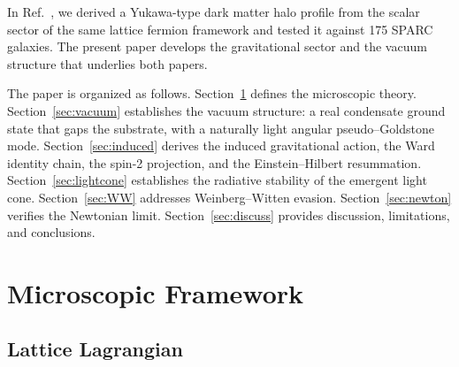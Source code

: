 \documentclass[11pt,a4paper]{article}
\begin{document}
In Ref.~\cite{Cheng:2025sparc}, we derived a Yukawa-type dark
matter halo profile from the scalar sector of the same lattice
fermion framework and tested it against 175 SPARC galaxies.
The present paper develops the gravitational sector and the vacuum
structure that underlies both papers.

The paper is organized as follows.
Section~\ref{sec:micro} defines the microscopic theory.
Section~\ref{sec:vacuum} establishes the vacuum structure: a real
condensate ground state that gaps the substrate, with a naturally
light angular pseudo--Goldstone mode.
Section~\ref{sec:induced} derives the induced gravitational action,
the Ward identity chain, the spin-2 projection, and the
Einstein--Hilbert resummation.
Section~\ref{sec:lightcone} establishes the radiative stability of
the emergent light cone.
Section~\ref{sec:WW} addresses Weinberg--Witten evasion.
Section~\ref{sec:newton} verifies the Newtonian limit.
Section~\ref{sec:discuss} provides discussion, limitations, and
conclusions.


\section{Microscopic Framework}
\label{sec:micro}

\subsection{Lattice Lagrangian}
\end{document}
